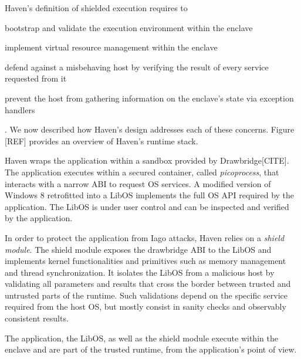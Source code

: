 Haven's definition of shielded execution requires to
\begin{enumerate*}
	\item bootstrap and validate the execution environment within the enclave
	\item implement virtual resource management within the enclave
	\item defend against a misbehaving host by verifying the result of every service requested from it
	\item prevent the host from gathering information on the enclave's state via exception handlers
\end{enumerate*}.
We now described how Haven's design addresses each of these concerns.
Figure [REF] provides an overview of Haven's runtime stack.

Haven wraps the application within a sandbox provided by Drawbridge[CITE].
The application executes within a secured container, called \emph{picoprocess}, that interacts with a narrow ABI to request OS services.
A modified version of Windows 8 retrofitted into a LibOS implements the full OS API required by the application.
The LibOS is under user control and can be inspected and verified by the application.

In order to protect the application from Iago attacks, Haven relies on a \emph{shield module}.
The shield module exposes the drawbridge ABI to the LibOS and implements kernel functionalities and primitives such as memory management and thread synchronization.
It isolates the LibOS from a malicious host by validating all parameters and results that cross the border between trusted and untrusted parts of the runtime.
Such validations depend on the specific service required from the host OS, but mostly consist in sanity checks and observably consistent results.

The application, the LibOS, as well as the shield module execute within the enclave and are part of the trusted runtime, from the application's point of view.




